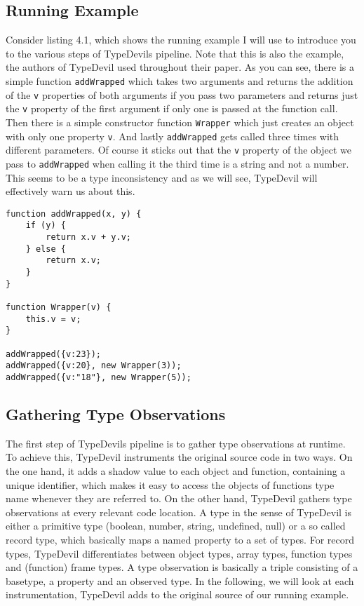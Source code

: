 \documentclass[runningheads,a4paper]{llncs}
\begin{document}
\subsection{Running Example}
Consider listing 4.1, which shows the running example I will use to introduce you to the various steps of TypeDevils pipeline.
Note that this is also the example, the authors of TypeDevil used throughout their paper.
As you can see, there is a simple function \lstinline[columns=fixed]{addWrapped} which takes two arguments and returns the addition of the \lstinline[columns=fixed]{v} properties of both arguments if you pass two parameters and returns just the \lstinline[columns=fixed]{v} property of the first argument if only one is passed at the function call.
Then there is a simple constructor function \lstinline[columns=fixed]{Wrapper} which just creates an object with only one property \lstinline[columns=fixed]{v}.
And lastly \lstinline[columns=fixed]{addWrapped} gets called three times with different parameters.
Of course it sticks out that the \lstinline[columns=fixed]{v} property of the object we pass to \lstinline[columns=fixed]{addWrapped} when calling it the third time is a string and not a number.
This seems to be a type inconsistency and as we will see, TypeDevil will effectively warn us about this.

\lstset{language=javascript}
\begin{minipage}{\linewidth}
\begin{lstlisting}[frame=single, caption=Running Example]
function addWrapped(x, y) {
    if (y) {
        return x.v + y.v;
    } else {
        return x.v;
    }
}

function Wrapper(v) {
    this.v = v;
}

addWrapped({v:23});
addWrapped({v:20}, new Wrapper(3));
addWrapped({v:"18"}, new Wrapper(5));
\end{lstlisting}
\end{minipage}


\subsection{Gathering Type Observations}

The first step of TypeDevils pipeline is to gather type observations at runtime.
To achieve this, TypeDevil instruments the original source code in two ways.
On the one hand, it adds a shadow value to each object and function, containing a unique identifier, which makes it easy to access the objects of functions type name whenever they are referred to. 
On the other hand, TypeDevil gathers type observations at every relevant code location.
A type in the sense of TypeDevil is either a primitive type (boolean, number, string, undefined, null) or a so called record type, which basically maps a named property to a set of types.
For record types, TypeDevil differentiates between object types, array types, function types and (function) frame types.
A type observation is basically a triple consisting of a basetype, a property and an observed type.
In the following, we will look at each instrumentation, TypeDevil adds to the original source of our running example.
\end{document}
